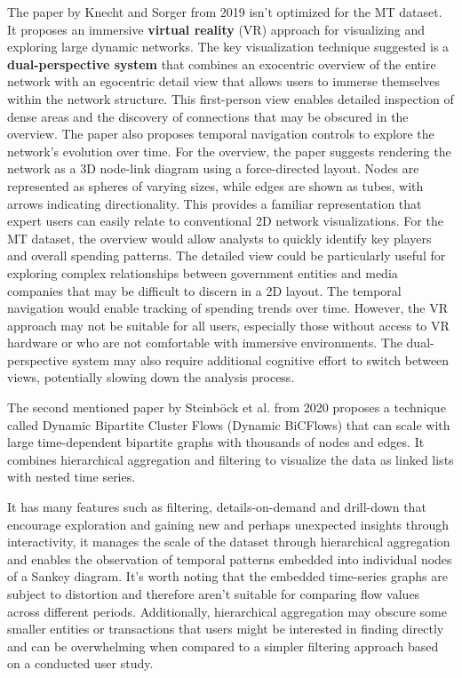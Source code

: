 \documentclass{vgtc}
\begin{document}
The paper by Knecht and Sorger from 2019 \cite{sorger2019immersive} isn't optimized for the MT dataset. It proposes an immersive \textbf{virtual reality} (VR) approach for visualizing and exploring large dynamic networks. The key visualization technique suggested is a \textbf{dual-perspective system} that combines an exocentric overview of the entire network with an egocentric detail view that allows users to immerse themselves within the network structure. This first-person view enables detailed inspection of dense areas and the discovery of connections that may be obscured in the overview. The paper also proposes temporal navigation controls to explore the network's evolution over time. For the overview, the paper suggests rendering the network as a 3D node-link diagram using a force-directed layout. Nodes are represented as spheres of varying sizes, while edges are shown as tubes, with arrows indicating directionality. This provides a familiar representation that expert users can easily relate to conventional 2D network visualizations.
For the MT dataset, the overview would allow analysts to quickly identify key players and overall spending patterns. The detailed view could be particularly useful for exploring complex relationships between government entities and media companies that may be difficult to discern in a 2D layout. The temporal navigation would enable tracking of spending trends over time. However, the VR approach may not be suitable for all users, especially those without access to VR hardware or who are not comfortable with immersive environments. The dual-perspective system may also require additional cognitive effort to switch between views, potentially slowing down the analysis process.

\medskip

The second mentioned paper by Steinböck et al. from 2020 \cite{Waldner2020InteractiveEO} proposes a technique called Dynamic Bipartite Cluster Flows (Dynamic BiCFlows) that can scale with large time-dependent bipartite graphs with thousands of nodes and edges. It combines hierarchical aggregation and filtering to visualize the data as linked lists with nested time series.

It has many features such as filtering, details-on-demand and drill-down that encourage exploration and gaining new and perhaps unexpected insights through interactivity, it manages the scale of the dataset through hierarchical aggregation and enables the observation of temporal patterns embedded into individual nodes of a Sankey diagram. It's worth noting that the embedded time-series graphs are subject to distortion and therefore aren't suitable for comparing flow values across different periods. Additionally, hierarchical aggregation may obscure some smaller entities or transactions that users might be interested in finding directly and can be overwhelming when compared to a simpler filtering approach based on a conducted user study.
\end{document}
